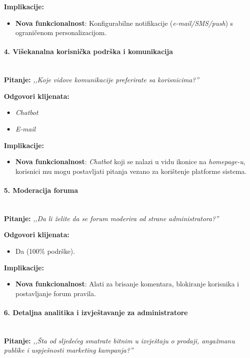 \textbf{Implikacije:}  
\begin{itemize}  
    \item \textbf{Nova funkcionalnost}: Konfigurabilne notifikacije (\emph{e-mail/SMS/push}) s ograničenom personalizacijom.  
\end{itemize}  

\paragraph*{4. Višekanalna korisnička podrška i komunikacija}~\\  
\textbf{Pitanje:}  
\emph{,,Koje vidove komunikacije preferirate sa korisnicima?''}  

\textbf{Odgovori klijenata:}  
\begin{itemize}  
    \item \emph{Chatbot}  
    \item \emph{E-mail}  
\end{itemize}  

\textbf{Implikacije:}  
\begin{itemize}  
    \item \textbf{Nova funkcionalnost}: \emph{Chatbot} koji se nalazi u vidu ikonice na \emph{homepage-u}, korisnici mu mogu postavljati pitanja vezano za korištenje platforme sistema.  
\end{itemize}  

\paragraph*{5. Moderacija foruma}~\\  
\textbf{Pitanje:}  
\emph{,,Da li želite da se forum moderira od strane administratora?''}  

\textbf{Odgovori klijenata:}  
\begin{itemize}  
    \item Da (100\% podrške).  
\end{itemize}  

\textbf{Implikacije:}  
\begin{itemize}  
    \item \textbf{Nova funkcionalnost}: Alati za brisanje komentara, blokiranje korisnika i postavljanje forum pravila.  
\end{itemize}  

\paragraph*{6. Detaljna analitika i izvještavanje za administratore}~\\
\textbf{Pitanje:}  
\emph{,,Šta od sljedećeg smatrate bitnim u izvještaju o prodaji, angažmanu publike i uspješnosti marketing kampanja?''}  

